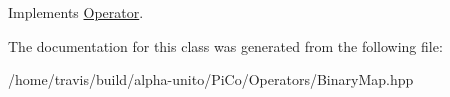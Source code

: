 \-Implements \hyperlink{class_operator}{\-Operator}.



\-The documentation for this class was generated from the following file\-:\begin{DoxyCompactItemize}
\item 
/home/travis/build/alpha-\/unito/\-Pi\-Co/\-Operators/\-Binary\-Map.\-hpp\end{DoxyCompactItemize}
